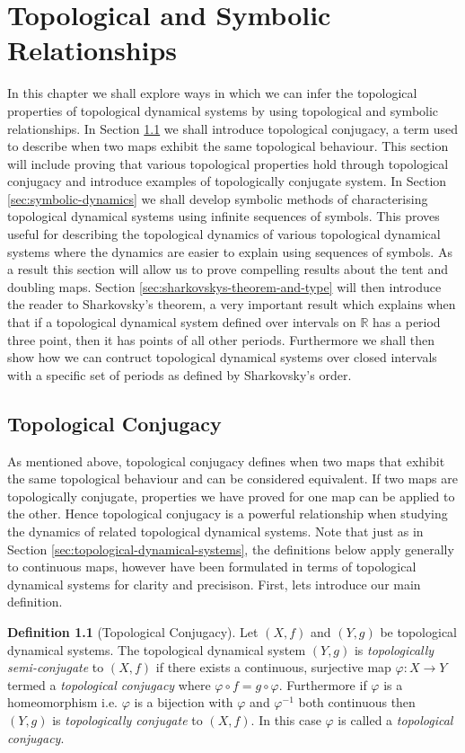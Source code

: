 \documentclass[11pt,a4paper,oneside]{memoir}
\theoremstyle{plain}
\theoremstyle{definition}
\newtheorem{defn}[thm]{Definition}
\begin{document}
\chapter{Topological and Symbolic Relationships} \label{chap:conjugacy-symbol-dynamics}
In this chapter we shall explore ways in which we can infer the topological properties of topological dynamical systems by using topological and symbolic relationships. In Section \ref{sec:topological-conjugacy} we shall introduce topological conjugacy, a term used to describe when two maps exhibit the same topological behaviour. This section will include proving that various topological properties hold through topological conjugacy and introduce examples of topologically conjugate system. In Section \ref{sec:symbolic-dynamics} we shall develop symbolic methods of characterising topological dynamical systems using infinite sequences of symbols. This proves useful for describing the topological dynamics of various topological dynamical systems where the dynamics are easier to explain using sequences of symbols. As a result this section will allow us to prove compelling results about the tent and doubling maps. Section \ref{sec:sharkovskys-theorem-and-type} will then introduce the reader to Sharkovsky's theorem, a very important result which explains when that if a topological dynamical system  defined over intervals on $\mathbb{R}$ has a period three point, then it has points of all other periods. Furthermore we shall then show how we can contruct topological dynamical systems over closed intervals with a specific set of periods as defined by Sharkovsky's order.

\section{Topological Conjugacy} \label{sec:topological-conjugacy}
As mentioned above, topological conjugacy defines when two maps that exhibit the same topological behaviour and can be considered equivalent. If two maps are topologically conjugate, properties we have proved for one map can be applied to the other. Hence topological conjugacy is a powerful relationship when studying the dynamics of related topological dynamical systems. Note that just as in Section \ref{sec:topological-dynamical-systems}, the definitions below apply generally to continuous maps, however have been formulated in terms of topological dynamical systems for clarity and precisison. First, lets introduce our main definition.

\begin{defn}[Topological Conjugacy] \label{defn:topological-conjugacy}
    Let $(X, f)$ and $(Y, g)$ be topological dynamical systems. The topological dynamical system $(Y, g)$ is \emph{topologically semi-conjugate} to $(X, f)$ if there exists a continuous, surjective map $\varphi: X \to Y$ termed a \emph{topological conjugacy} where $\varphi \circ f = g \circ \varphi$. Furthermore if $\varphi$ is a homeomorphism i.e. $\varphi$ is a bijection with $\varphi$ and $\varphi^{-1}$ both continuous then $(Y, g)$ is \emph{topologically conjugate} to $(X, f)$. In this case $\varphi$ is called a \emph{topological conjugacy}.
\end{defn}
\end{document}
